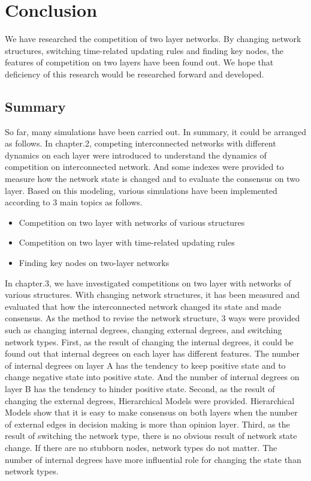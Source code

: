 
\chapter{Conclusion}
\label{chap:conclusion}
We have researched the competition of two layer networks. By changing network structures, switching time-related updating rules and finding key nodes, the features of competition on two layers have been found out. We hope that deficiency of this research would be researched forward and developed. 
\section{Summary}
So far, many simulations have been carried out. In summary, it could be arranged as follows. 
In chapter.2, competing interconnected networks with different dynamics on each layer were introduced to understand the dynamics of competition on interconnected network.  And some indexes were provided to measure how the network state is changed and to evaluate the consensus on two layer. Based on this modeling, various simulations have been implemented according to 3 main topics as follows.
\begin{itemize}
\item Competition on two layer with networks of various structures
\item Competition on two layer with time-related updating rules
\item Finding key nodes on two-layer networks
\end{itemize}
In chapter.3, we have investigated competitions on two layer with networks of various structures. With changing network structures, it has been measured and evaluated that how the interconnected network changed its state and made consensus. As the method to revise the network structure, 3 ways were provided such as changing internal degrees, changing external degrees, and switching network types. 
First, as the result of changing the internal degrees, it could be found out that internal degrees on each layer has different features. The number of internal degrees on layer A has the tendency to keep positive state and to change negative state into positive state. And the number of internal degrees on layer B has the tendency to hinder positive state. Second, as the result of changing the external degrees, Hierarchical Models were provided. Hierarchical Models show that it is easy to make consensus on both layers when the number of external edges in decision making is more than opinion layer. Third, as the result of switching the network type, there is no obvious result of network state change. If there are no stubborn nodes, network types do not matter. The number of internal degrees have more influential role for changing the state than network types.\\

